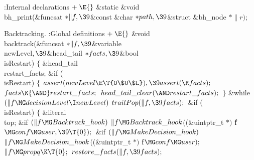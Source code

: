 \Y\B\4:Internal declarations\X${}\mathrel+\E{}$\6
\&{static} \&{void} \\{bh\_print}(\&{funcsat} ${}{*}\|f,\39{}$\&{const} %
\&{char} ${}{*}\\{path},\39{}$\&{struct} \&{bh\_node} ${}{*}\|r){}$;\par
\fi

Backtracking.
\Y\B\4:Global definitions\X${}\mathrel+\E{}$\6
\&{void} \\{backtrack}(\&{funcsat} ${}{*}\|f,\39{}$\&{variable} %
\\{newLevel}${},\39{}$\&{head\_tail} ${}{*}\\{facts},\39{}$\&{bool} %
\\{isRestart})\1\1\2\2\6
${}\{{}$\1\6
\&{head\_tail} \\{restart\_facts};\7
\&{if} (\\{isRestart})\5
${}\{{}$\1\6
${}\\{assert}(\\{newLevel}\E\T{0\$U\$L}),\39\\{assert}(\R\\{facts});{}$\6
${}\\{facts}\K{\AND}\\{restart\_facts};{}$\6
${}\\{head\_tail\_clear}({\AND}\\{restart\_facts});{}$\6
\4${}\}{}$\2\6
\&{while} ${}(\|f\MG\\{decisionLevel}\I\\{newLevel}){}$\1\5
${}\\{trailPop}(\|f,\39\\{facts});{}$\2\6
\&{if} (\\{isRestart})\5
${}\{{}$\1\6
\&{literal} \\{top};\7
\&{if} ${}(\|f\MG\\{Backtrack\_hook}){}$\1\5
${}\|f\MG\\{Backtrack\_hook}{}$((\&{uintptr\_t} ${}{*}){}$ \|f${}\MG\\{conf}\MG%
\\{user},\39\T{0});{}$\2\6
\&{if} ${}(\|f\MG\\{MakeDecision\_hook}){}$\1\5
${}\|f\MG\\{MakeDecision\_hook}{}$((\&{uintptr\_t} ${}{*}){}$ \|f${}\MG\\{conf}%
\MG\\{user});{}$\2\6
${}\|f\MG\\{propq}\K\T{0};{}$\6
${}\\{restore\_facts}(\|f,\39\\{facts});{}$\6
